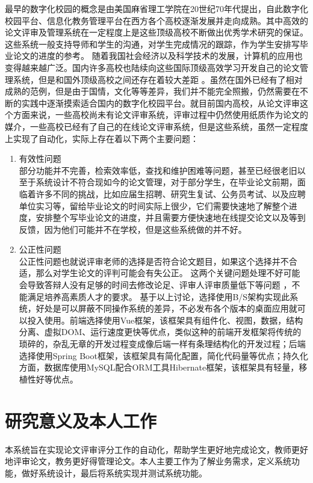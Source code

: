 最早的数字化校园的概念是由美国麻省理工学院在20世纪70年代提出\cite{张磊2020数字校园下高职院校教务管理系统设计}，自此数字化校园平台、信息化教务管理平台在西方各个高校逐渐发展并走向成熟。其中高效的论文评审及管理系统在一定程度上是这些顶级高校不断做出优秀学术研究的保证。这些系统一般支持导师和学生的沟通，对学生完成情况的跟踪，作为学生安排写毕业论文的进度的参考。
随着我国社会经济以及科学技术的发展，计算机的应用也变得越来越广泛\cite{.2020h}。国内许多高校也陆续向这些国际顶级高效学习开发自己的论文管理系统，但是和国外顶级高校之间还存在着较大差距 \cite{.2017e}。虽然在国外已经有了相对成熟的范例，但是由于国情，文化等等差异，我们并不能完全照搬，仍然需要在不断的实践中逐渐摸索适合国内的数字化校园平台。就目前国内高校，从论文评审这个方面来说，一些高校尚未有论文评审系统，评审过程中仍然使用纸质作为论文的媒介，一些高校已经有了自己的在线论文评审系统，但是这些系统，虽然一定程度上实现了自动化，实际上存在着以下两个主要问题：
\begin{enumerate}
	\item 有效性问题\cite{.2019d}\\
	      部分功能并不完善，检索效率低，查找和维护困难等问题，甚至已经很老旧以至于系统设计不符合现如今的论文管理，对于部分学生，在毕业论文前期，面临着许多不同的挑战，比如应届生招聘、研究生复试、公务员考试、以及应聘单位实习等，留给毕业论文的时间实际上很少\cite{.2019c}，它们需要快速地了解整个进度，安排整个写毕业论文的进度，并且需要方便快速地在线提交论文以及等到反馈，因为他们可能并不在学校，但是这些系统做的并不好。
	\item 公正性问题\cite{.2019d}\\
	      公正性问题也就说评审老师的选择是否符合论文题目，如果这个选择并不合适，那么对学生论文的评判可能会有失公正\cite{Setiyani.2020}。
	      这两个关键问题处理不好可能会导致答辩人没有足够的时间去修改论足、评审人评审质量低下等问题 ，不能满足培养高素质人才的要求\cite{.2019d}。
	      基于以上讨论，选择使用B/S架构实现此系统，好处是可以屏蔽不同操作系统的差异，不必发布各个版本的桌面应用就可以投入使用。前端选择使用Vue框架，该框架具有组件化、视图，数据，结构分离、虚拟DOM、运行速度更快等优点，类似这种的前端开发框架将传统的琐碎的，杂乱无章的开发过程变成像后端一样有条理结构化的开发过程；后端选择使用Spring Boot框架，该框架具有简化配置，简化代码量等优点；持久化方面，数据库使用MySQL配合ORM工具Hibernate框架，该框架具有轻量，移植性好等优点。
\end{enumerate}

\section{研究意义及本人工作}

本系统旨在实现论文评审评分工作的自动化，帮助学生更好地完成论文，教师更好地评审论文，教务更好得管理论文。本人主要工作为了解业务需求，定义系统功能，做好系统设计，最后将系统实现并测试系统功能。